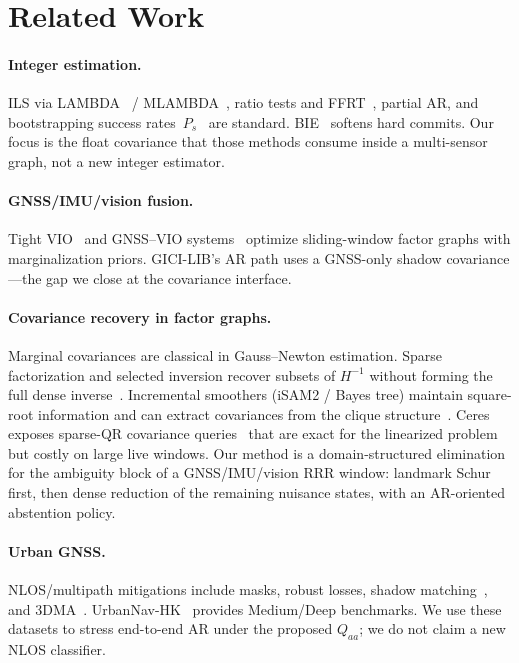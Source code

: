 \documentclass[letterpaper, journal, twocolumn]{IEEEtran}
\begin{document}
\section{Related Work}
\label{sec:related}

\paragraph{Integer estimation.}
ILS via LAMBDA~\cite{teunissen1995lambda} / MLAMBDA~\cite{chang2005mlambda},
ratio tests and FFRT~\cite{verhagen2013ffrt,euler1990ratio}, partial AR, and
bootstrapping success rates~$P_s$~\cite{teunissen1998success} are standard.
BIE~\cite{teunissen2003bie,odolinski2020bie} softens hard commits.
Our focus is the float covariance that those methods consume inside a
multi-sensor graph, not a new integer estimator.

\paragraph{GNSS/IMU/vision fusion.}
Tight VIO~\cite{qin2018vins,leutenegger2015okvis} and GNSS--VIO
systems~\cite{cao2022gvins,chi2023gici} optimize sliding-window factor graphs
with marginalization priors.
GICI-LIB's AR path uses a GNSS-only shadow covariance---the gap we close at
the covariance interface.

\paragraph{Covariance recovery in factor graphs.}
Marginal covariances are classical in Gauss--Newton estimation.
Sparse factorization and selected inversion recover subsets of
$H^{-1}$ without forming the full dense inverse~\cite{erisman1975sparse,li2008selected}.
Incremental smoothers (iSAM2 / Bayes tree) maintain square-root information
and can extract covariances from the clique
structure~\cite{kaess2012isam2,dellaert2017factor}.
Ceres exposes sparse-QR covariance queries~\cite{agarwal2023ceres} that are
exact for the linearized problem but costly on large live windows.
Our method is a domain-structured elimination for the ambiguity block of a
GNSS/IMU/vision RRR window: landmark Schur first, then dense reduction of the
remaining nuisance states, with an AR-oriented abstention policy.

\paragraph{Urban GNSS.}
NLOS/multipath mitigations include masks, robust losses, shadow
matching~\cite{groves2011shadow}, and 3DMA~\cite{ng2020_3dma,wen2021nlos}.
UrbanNav-HK~\cite{huang2020urbannav} provides Medium/Deep benchmarks.
We use these datasets to stress end-to-end AR under the proposed $Q_{aa}$; we
do not claim a new NLOS classifier.
\end{document}
